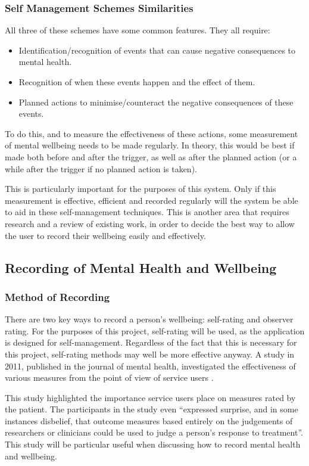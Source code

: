 \documentclass[11pt,openright,a4paper]{report}
\begin{document}
\subsubsection{Self Management Schemes Similarities}
All three of these schemes have some common features. They all require:
\begin{itemize}
\item Identification/recognition of events that can cause negative consequences to mental health.
\item Recognition of when these events happen and the effect of them.
\item Planned actions to minimise/counteract the negative consequences of these events.
\end{itemize}

To do this, and to measure the effectiveness of these actions, some measurement of mental wellbeing needs to be made regularly. In theory, this would be best if made both before and after the trigger, as well as after the planned action (or a while after the trigger if no planned action is taken).

This is particularly important for the purposes of this system. Only if this measurement is effective, efficient and recorded regularly will the system be able to aid in these self-management techniques. This is another area that requires research and a review of existing work, in order to decide the best way to allow the user to record their wellbeing easily and effectively.

\subsection{Recording of Mental Health and Wellbeing} \label{recordingmentalhealth}
\subsubsection{Method of Recording} \label{methodofrecording}
There are two key ways to record a person's wellbeing: self-rating and observer rating. For the purposes of this project, self-rating will be used, as the application is designed for self-management. Regardless of the fact that this is necessary for this project, self-rating methods may well be more effective anyway. A study in 2011, published in the journal of mental health, investigated the effectiveness of various measures from the point of view of service users \parencite{crawford2011selecting}.

This study highlighted the importance service users place on measures rated by the patient. The participants in the study even \enquote{expressed surprise, and in some instances disbelief, that outcome measures based entirely on the judgements of researchers or clinicians could be used to judge a person’s response to treatment}. This study will be particular useful when discussing how to record mental health and wellbeing.
\end{document}
